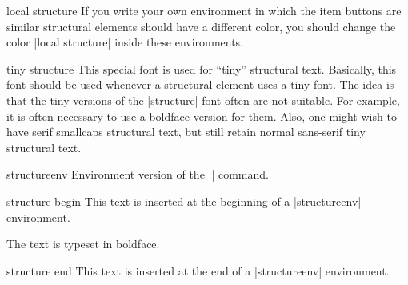 \begin{command}{\structure{}}
\begin{element}{local structure}
    If you write your own environment in which the item buttons are
    similar structural elements should have a different color, you
    should change the color |local structure| inside these
    environments.
  \end{element}

  \begin{element}{tiny structure}\no\no\yes
    This special font is used for ``tiny'' structural text. Basically,
    this font should be used whenever a structural element uses a tiny
    font. The idea is that the tiny versions of the |structure| font
    often are not suitable. For example, it is often necessary to use a
    boldface version for them. Also, one might wish to have serif smallcaps
    structural text, but still retain normal sans-serif tiny structural
    text.
  \end{element}
\end{command}

\begin{environment}{{structureenv}}
  Environment version of the |\structure| command.

  \begin{element}{structure begin}\yes\no\no
    This text is inserted at the beginning of a |structureenv|
    environment.

    \begin{templateoptions}

      \articlenote
      The text is typeset in boldface.
    \end{templateoptions}
  \end{element}

  \begin{element}{structure end}\yes\no\no
    This text is inserted at the end of a |structureenv| environment.
  \end{element}
\end{environment}


